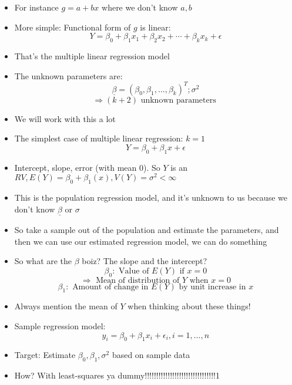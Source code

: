 \documentclass{article}
\begin{document}
\begin{itemize}
\[      \] 
    \item For instance $ g = a + bx $ where we don't know  $ a, b $
    \item More simple: Functional form of $ g $ is linear:
       \[
        Y = \beta_0 + \beta_1 x_1 + \beta_2 x_2 + \cdots + \beta_k x_k + \epsilon
      \] 
    \item That's the multiple linear regression model
    \item The unknown parameters are:
      \[
      \underline{\beta} = {(\beta_0, \beta_1, \ldots, \beta_k)}^T; \sigma^2
      \] 
      \[
        \Rightarrow (k + 2) \text{ unknown parameters }
      \] 
    \item We will work with this a lot
    \item The simplest case of multiple linear regression: $ k = 1 $
     \[
      Y = \beta_0 + \beta_1 x + \epsilon
    \] 
  \item Intercept, slope, error (with mean 0). So $ Y $ is an  $ RV, E(Y) = \beta_0 + \beta_1(x), V(Y) = \sigma^2 < \infty $
  \item This is the population regression model, and it's unknown to us because we don't know $ \underline{\beta} $ or $ \sigma $
  \item So take a sample out of the population and estimate the parameters, and then we can use our estimated regression model, we can do something
  \item So what are the  $ \beta $ boiz? The slope and the intercept? 
    \[
      \beta_0: \text{ Value of } E(Y) \text{ if } x = 0
    \] 
    \[
      \Rightarrow \text{ Mean of distribution of } Y \text{ when } x = 0
    \] 
    \[
      \beta_1: \text{ Amount of change in  } E(Y) \text{ by unit increase in } x
    \] 
  \item Always mention the mean of $ Y $ when thinking about these things!
  \item Sample regression model: 
    \[
      y_i = \beta_0 + \beta_1 x_i + \epsilon_i, i = 1, \ldots, n
    \] 
  \item Target: Estimate $ \beta_0, \beta_1, \sigma^2 $ based on sample data
  \item How? With least-squares ya dummy!!!!!!!!!!!!!!!!!!!!!!!!!!!!!!!1
  \end{itemize}
\end{document}
